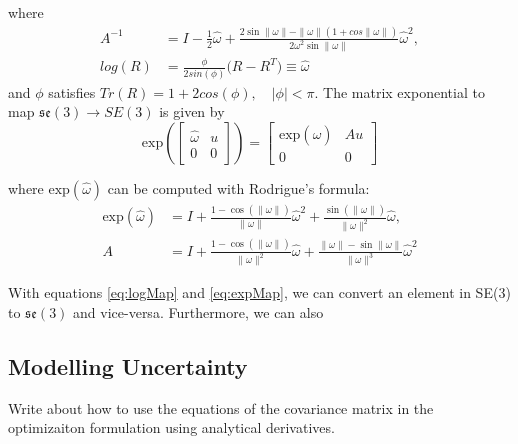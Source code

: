 \noindent where 
\begin{equation*}
\begin{aligned}
    A^{-1} &= I - \frac{1}{2}\hat{\omega} +
\frac{2\sin\|\omega\| - \|\omega\|(1+cos\|\omega\|) }{2\omega^{2} \sin\|\omega\|}\hat{\omega}^{2},  \\
log(R) &= \frac{\phi}{2sin(\phi)}\big(R - R^T\big) \equiv \hat{\omega}
\end{aligned}
\end{equation*}
and $\phi$ satisfies $Tr(R) = 1+2cos(\phi), \quad |\phi|<\pi$.
\vspace{5pt}
\noindent The matrix exponential to map $\mathfrak{se}(3) \to SE(3)$ is given by
\begin{equation}
    \text{exp}\left(
        \begin{bmatrix}
            \hat{\omega} & u \\
            0 & 0
        \end{bmatrix}
    \right)  =
    \begin{bmatrix}
        \text{exp}(\hat{\omega}) & Au \\
        0 & 0
    \end{bmatrix}
    \label{eq:expMap}
\end{equation}

\noindent where $\text{exp}(\hat{\omega})$ can be computed with Rodrigue's formula:
\begin{equation*}
\begin{aligned}
    \text{exp}(\hat{\omega}) &= I + \frac{1-\cos(\|\omega\|)}{\|\omega\|}\hat{\omega}^2 +
    \frac{\sin(\|\omega\|)}{\|\omega\|^2}\hat{\omega},\\
    A &= I + \frac{1-\cos(\|\omega\|)}{\|\omega\|^2}\hat{\omega} + \frac{\|\omega\| - \sin\|\omega\|}{\|\omega\|^3}\hat{\omega}^2
\end{aligned}
\end{equation*}

With equations \eqref{eq:logMap} and \eqref{eq:expMap}, we can convert an element in SE(3) to $\mathfrak{se}(3)$ and vice-versa. Furthermore, we can also 

\subsection{Modelling Uncertainty }
Write about how to use the equations of the covariance matrix in the optimizaiton formulation using analytical derivatives. 



